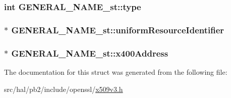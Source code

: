 \subsubsection[{\texorpdfstring{type}{type}}]{\setlength{\rightskip}{0pt plus 5cm}int G\+E\+N\+E\+R\+A\+L\+\_\+\+N\+A\+M\+E\+\_\+st\+::type}\hypertarget{struct_g_e_n_e_r_a_l___n_a_m_e__st_adee285a4ad25557f12d51af03e1cf0e2}{}\label{struct_g_e_n_e_r_a_l___n_a_m_e__st_adee285a4ad25557f12d51af03e1cf0e2}
\subsubsection[{\texorpdfstring{uniform\+Resource\+Identifier}{uniformResourceIdentifier}}]{$\ast$ G\+E\+N\+E\+R\+A\+L\+\_\+\+N\+A\+M\+E\+\_\+st\+::uniform\+Resource\+Identifier}\hypertarget{struct_g_e_n_e_r_a_l___n_a_m_e__st_ade56ddf2991bf7b003bae3af6c0d8abc}{}\label{struct_g_e_n_e_r_a_l___n_a_m_e__st_ade56ddf2991bf7b003bae3af6c0d8abc}
\subsubsection[{\texorpdfstring{x400\+Address}{x400Address}}]{$\ast$ G\+E\+N\+E\+R\+A\+L\+\_\+\+N\+A\+M\+E\+\_\+st\+::x400\+Address}\hypertarget{struct_g_e_n_e_r_a_l___n_a_m_e__st_a7604972ca3d4a6c91fb715e0e2c35239}{}\label{struct_g_e_n_e_r_a_l___n_a_m_e__st_a7604972ca3d4a6c91fb715e0e2c35239}


The documentation for this struct was generated from the following file\+:\begin{DoxyCompactItemize}
\item 
src/hal/pb2/include/openssl/\hyperlink{x509v3_8h}{x509v3.\+h}\end{DoxyCompactItemize}
